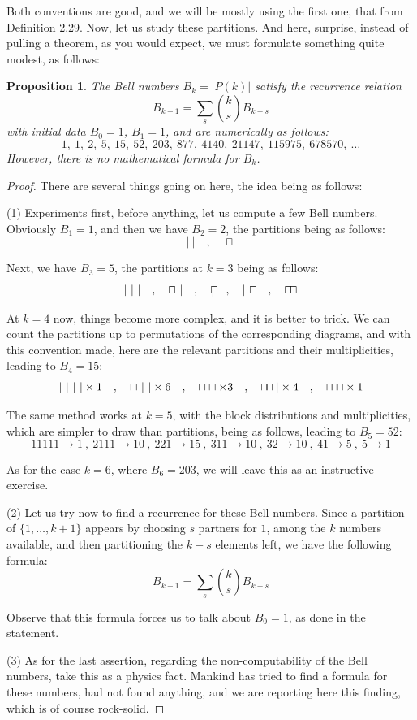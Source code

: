 \documentclass[12pt]{amsbook}
\newtheorem{proposition}[theorem]{Proposition}
\begin{document}
Both conventions are good, and we will be mostly using the first one, that from Definition 2.29. Now, let us study these partitions. And here, surprise, instead of pulling a theorem, as you would expect, we must formulate something quite modest, as follows:

\begin{proposition}
The Bell numbers $B_k=|P(k)|$ satisfy the recurrence relation
$$B_{k+1}=\sum_s\binom{k}{s}B_{k-s}$$
with initial data $B_0=1$, $B_1=1$, and are numerically as follows:
$$1,\ 1,\ 2,\ 5,\ 15,\ 52,\ 203,\ 877,\ 4140,\ 21147,\ 115975,\ 678570,\ \ldots$$
However, there is no mathematical formula for $B_k$.
\end{proposition}

\begin{proof}
There are several things going on here, the idea being as follows:

\medskip

(1) Experiments first, before anything, let us compute a few Bell numbers. Obviously $B_1=1$, and then we have $B_2=2$, the partitions being as follows:
$$|\ |\quad,\quad\sqcap$$

Next, we have $B_3=5$, the partitions at $k=3$ being as follows:
$$|\ |\ |\quad,\quad\sqcap\ |\quad,\quad\sqcap\hskip-3.2mm{\ }_|\quad,\quad|\ \sqcap\quad,\quad\sqcap\hskip-0.7mm\sqcap$$

At $k=4$ now, things become more complex, and it is better to trick. We can count the partitions up to permutations of the corresponding diagrams, and with this convention made, here are the relevant partitions and their multiplicities, leading to $B_4=15$:
$$|\ |\ |\ |\times1\quad,\quad \sqcap\ |\ |\times 6\quad,\quad \sqcap\sqcap\times 3
\quad,\quad \sqcap\hskip-1.6mm\sqcap|\times4\quad,\quad \sqcap\hskip-1.6mm\sqcap\hskip-1.6mm\sqcap\times1$$

The same method works at $k=5$, with the block distributions and multiplicities, which are simpler to draw than partitions, being as follows, leading to $B_5=52$:
$$11111\to1\ ,\ 2111\to10\ ,\ 221\to15\ ,\ 311\to10\ ,\ 32\to10\ ,\ 41\to5\ ,\ 5\to1$$

As for the case $k=6$, where $B_6=203$, we will leave this as an instructive exercise.

\medskip

(2) Let us try now to find a recurrence for these Bell numbers. Since a partition of $\{1,\ldots,k+1\}$ appears by choosing $s$ partners for $1$, among the $k$ numbers available, and then partitioning the $k-s$ elements left, we have the following formula:
$$B_{k+1}=\sum_s\binom{k}{s}B_{k-s}$$

Observe that this formula forces us to talk about $B_0=1$, as done in the statement.

\medskip

(3) As for the last assertion, regarding the non-computability of the Bell numbers, take this as a physics fact. Mankind has tried to find a formula for these numbers, had not found anything, and we are reporting here this finding, which is of course rock-solid.
\end{proof}
\end{document}
